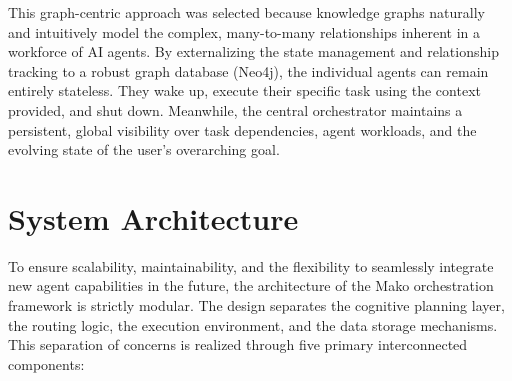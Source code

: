 This graph-centric approach was selected because knowledge graphs naturally and intuitively model the complex, many-to-many relationships inherent in a workforce of AI agents. By externalizing the state management and relationship tracking to a robust graph database (Neo4j), the individual agents can remain entirely stateless. They wake up, execute their specific task using the context provided, and shut down. Meanwhile, the central orchestrator maintains a persistent, global visibility over task dependencies, agent workloads, and the evolving state of the user's overarching goal.

\section{System Architecture}
To ensure scalability, maintainability, and the flexibility to seamlessly integrate new agent capabilities in the future, the architecture of the Mako orchestration framework is strictly modular. The design separates the cognitive planning layer, the routing logic, the execution environment, and the data storage mechanisms. This separation of concerns is realized through five primary interconnected components:

